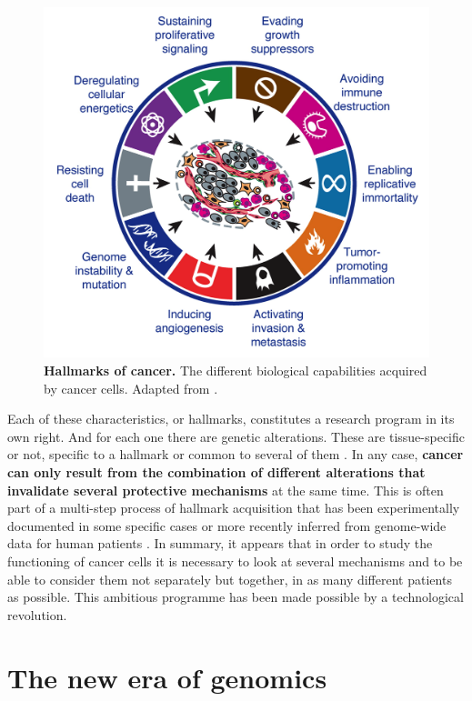 \documentclass[a4paper,12pt,twoside,onecolumn,openright,final,oldfontcommands]{memoir}
\begin{document}
\begin{figure}

{\centering \includegraphics[width=0.7\linewidth]{fig/hallmarks} 

}

\caption[Hallmarks of cancer]{\textbf{Hallmarks of cancer.} The different
biological capabilities acquired by cancer cells. Adapted from
\citet{hanahan2011hallmarks}.}\label{fig:hallmarks}
\end{figure}





Each of these characteristics, or hallmarks, constitutes a research
program in its own right. And for each one there are genetic
alterations. These are tissue-specific or not, specific to a hallmark or
common to several of them \citep{hanahan2000hallmarks}. In any case,
\textbf{cancer can only result from the combination of different
alterations that invalidate several protective mechanisms} at the same
time. This is often part of a multi-step process of hallmark acquisition
that has been experimentally documented in some specific cases
\citep{hahn1999creation} or more recently inferred from genome-wide data
for human patients \citep{tomasetti2015only}. In summary, it appears
that in order to study the functioning of cancer cells it is necessary
to look at several mechanisms and to be able to consider them not
separately but together, in as many different patients as possible. This
ambitious programme has been made possible by a technological
revolution.

\section{The new era of genomics}\label{the-new-era-of-genomics}
\end{document}
